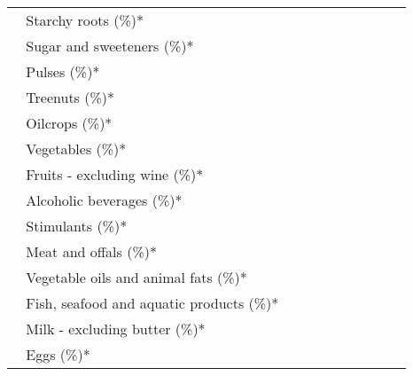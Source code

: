 \begin{tabular}{L{3.9cm} R{1cm} R{1cm} R{1cm}}
	 ~ Starchy roots (\%)* &  ~ \ \ &  ~ \ \ &  ~ \ \ \\ 
	 ~ Sugar and sweeteners (\%)* &  ~ \ \ &  ~ \ \ &  ~ \ \ \\ 
	 ~ Pulses (\%)* &  ~ \ \ &  ~ \ \ &  ~ \ \ \\ 
	 ~ Treenuts (\%)* &  ~ \ \ &  ~ \ \ &  ~ \ \ \\ 
	 ~ Oilcrops (\%)* &  ~ \ \ &  ~ \ \ &  ~ \ \ \\ 
	 ~ Vegetables (\%)* &  ~ \ \ &  ~ \ \ &  ~ \ \ \\ 
	 ~ Fruits - excluding wine (\%)* &  ~ \ \ &  ~ \ \ &  ~ \ \ \\ 
	 ~ Alcoholic beverages (\%)* &  ~ \ \ &  ~ \ \ &  ~ \ \ \\ 
	 ~ Stimulants (\%)* &  ~ \ \ &  ~ \ \ &  ~ \ \ \\ 
	 ~ Meat and offals (\%)* &  ~ \ \ &  ~ \ \ &  ~ \ \ \\ 
	 ~ Vegetable oils and animal fats (\%)* &  ~ \ \ &  ~ \ \ &  ~ \ \ \\ 
	 ~ Fish, seafood and aquatic products (\%)* &  ~ \ \ &  ~ \ \ &  ~ \ \ \\ 
	 ~ Milk - excluding butter (\%)* &  ~ \ \ &  ~ \ \ &  ~ \ \ \\ 
	 ~ Eggs (\%)* &  ~ \ \ &  ~ \ \ &  ~ \ \ \\ 
       \toprule
      \end{tabular}
      \clearpage
{}
